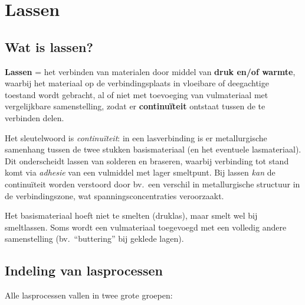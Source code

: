 
\chapter{Lassen}

\section{Wat is lassen?}

\begin{conceptbox}[Definitie]
\textbf{Lassen} = het verbinden van materialen door middel van \textbf{druk en/of warmte},
waarbij het materiaal op de verbindingsplaats in vloeibare of deegachtige toestand wordt
gebracht, al of niet met toevoeging van vulmateriaal met vergelijkbare samenstelling,
zodat er \textbf{continuïteit} ontstaat tussen de te verbinden delen.
\end{conceptbox}

Het sleutelwoord is \emph{continuïteit}: in een lasverbinding is er metallurgische samenhang
tussen de twee stukken basismateriaal (en het eventuele lasmateriaal).  Dit onderscheidt
lassen van solderen en braseren, waarbij verbinding tot stand komt via \emph{adhesie} van een
vulmiddel met lager smeltpunt.  Bij lassen \emph{kan} de continuïteit worden verstoord door
bv.\ een verschil in metallurgische structuur in de verbindingszone, wat spanningsconcentraties
veroorzaakt.

Het basismateriaal hoeft niet te smelten (druklas), maar smelt wel bij smeltlassen.  Soms
wordt een vulmateriaal toegevoegd met een volledig andere samenstelling (bv.\ ``buttering''
bij geklede lagen).

\section{Indeling van lasprocessen}

Alle lasprocessen vallen in twee grote groepen:

